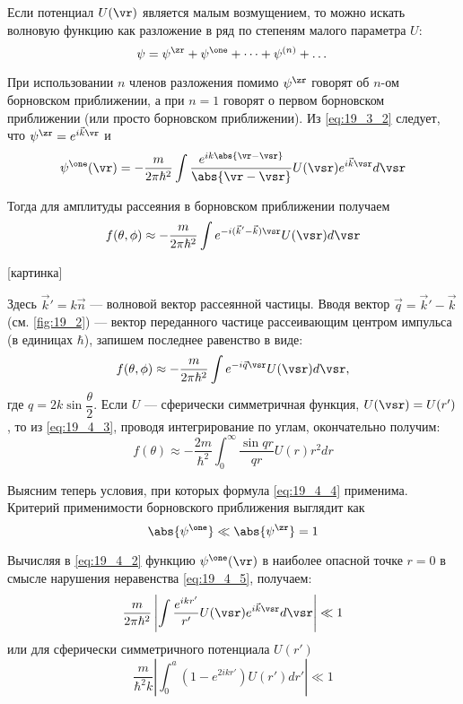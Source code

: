 Если потенциал $U(\vr)$ является малым возмущением, то можно искать волновую функцию как разложение в ряд по степеням малого параметра $U$:
\begin{equation}
\label{eq:19_4_1}
\psi = \psi^\zr + \psi^\one + \dots + \psi^{(n)} + \dots
\end{equation}

При использовании $n$ членов разложения помимо $\psi^\zr$ говорят об $n$-ом борновском приближении, а при $n = 1$ говорят о первом борновском приближении (или просто борновском приближении). Из \eqref{eq:19_3_2} следует, что $\psi^\zr = e^{i \vec{k} \vr}$ и
\begin{equation}
\label{eq:19_4_2}
\psi^\one(\vr) = -\frac{m}{2\pi \hbar^2} \int \frac{e^{ik \abs{\vr - \vsr}}}{\abs{\vr - \vsr}} U(\vsr) e^{i \vec{k} \vsr} d\vsr
\end{equation}

Тогда для амплитуды рассеяния в борновском приближении получаем
$$
f(\theta, \phi) \approx  -\frac{m}{2\pi \hbar^2} \int e^{-i(\vec{k}'-\vec{k})\vsr} U(\vsr) d\vsr
$$

[картинка]

Здесь $\vec{k}' = k \vec{n}$ --- волновой вектор рассеянной частицы. Вводя вектор $\vec{q} = \vec{k}'- \vec{k}$ (см. \autoref{fig:19_2}) --- вектор переданного частице рассеивающим центром импульса (в единицах $\hbar$), запишем последнее равенство в виде:
\begin{equation}
\label{eq:19_4_3}
f(\theta, \phi) \approx  -\frac{m}{2\pi \hbar^2} \int e^{-i \vec{q}\vsr} U(\vsr) d\vsr,
\end{equation}
где $q = 2k \sin \dfrac{\theta}{2}$. Если $U$ --- сферически симметричная функция, $U(\vsr) = U(r')$, то из \eqref{eq:19_4_3}, проводя интегрирование по углам, окончательно получим:
\begin{equation}
\label{eq:19_4_4}
f(\theta) \approx -\frac{2m}{\hbar^2} \int_0^\infty \frac{\sin qr}{qr}U(r)r^2 dr
\end{equation}

Выясним теперь условия, при которых формула \eqref{eq:19_4_4} применима. Критерий применимости борновского приближения выглядит как
\begin{equation}
\label{eq:19_4_5}
\abs{\psi^\one} \ll \abs{\psi^\zr} = 1
\end{equation}

Вычисляя в \eqref{eq:19_4_2} функцию $\psi^\one(\vr)$ в наиболее опасной точке $r = 0$ в смысле нарушения неравенства \eqref{eq:19_4_5}, получаем:
$$
\frac{m}{2 \pi \hbar^2} \left| \int \frac{e^{ikr'}}{r'} U(\vsr) e^{i\vec{k} \vsr}d\vsr\right | \ll 1
$$
или для сферически симметричного потенциала $U(r')$
\begin{equation}
\label{eq:19_4_6}
\boxed{\frac{m}{\hbar^2 k} \left| \int_0^a (1 - e^{2ikr'}) U(r') dr'\right | \ll 1}
\end{equation}

